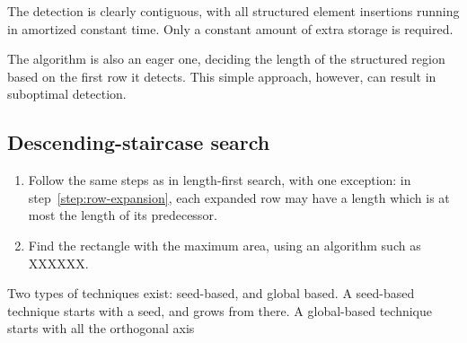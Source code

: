 The detection is clearly contiguous, with all structured element insertions running in amortized constant time. Only a constant amount of extra storage is required.

The algorithm is also an eager one, deciding the length of the structured region based on the first row it detects. This simple approach, however, can result in suboptimal detection.



\subsection{Descending-staircase search}
\begin{enumerate}
\item Follow the same steps as in length-first search, with one exception: in step~\ref{step:row-expansion}, each expanded row may have a length which is at most the length of its predecessor.
\item Find the rectangle with the maximum area, using an algorithm such as XXXXXX.
\end{enumerate}



Two types of techniques exist: seed-based, and global based. A seed-based technique starts with a seed, and grows from there. A global-based technique starts with all the orthogonal axis